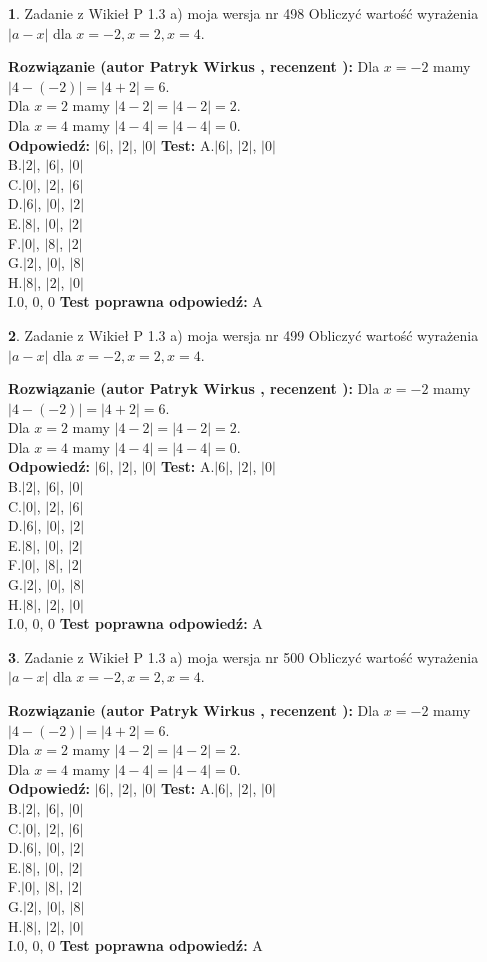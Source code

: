 \documentclass[12pt, a4paper]{article}
\theoremstyle{definition} %
\newtheorem{zad}{}
\newcommand{\zadStart}[1]{\begin{zad}#1\newline}
\newcommand{\zadStop}{\end{zad}}
\newcommand{\rozwStart}[2]{\noindent \textbf{Rozwiązanie (autor #1 , recenzent #2): }\newline}
\newcommand{\rozwStop}{\newline}
\newcommand{\odpStart}{\noindent \textbf{Odpowiedź:}\newline}
\newcommand{\odpStop}{\newline}
\newcommand{\testStart}{\noindent \textbf{Test:}\newline}
\newcommand{\testStop}{\newline}
\newcommand{\kluczStart}{\noindent \textbf{Test poprawna odpowiedź:}\newline}
\newcommand{\kluczStop}{\newline}
\begin{document}
\zadStart{Zadanie z Wikieł P 1.3 a) moja wersja nr 498}
Obliczyć wartość wyrażenia $|a - x|$ dla $x=-2,x=2,x=4$.
\zadStop
\rozwStart{Patryk Wirkus}{}
Dla $x = -2$ mamy $|4 - (-2)| = |4 + 2| = 6$.\\
Dla $x = 2$ mamy $|4 - 2| = |4 - 2| = 2$.\\
Dla $x = 4$ mamy $|4 - 4| = |4 - 4| = 0$.\\
\rozwStop
\odpStart
$|6|$, $|2|$, $|0|$
\odpStop
\testStart
A.$|6|$, $|2|$, $|0|$\\
B.$|2|$, $|6|$, $|0|$\\
C.$|0|$, $|2|$, $|6|$\\
D.$|6|$, $|0|$, $|2|$\\
E.$|8|$, $|0|$, $|2|$\\
F.$|0|$, $|8|$, $|2|$\\
G.$|2|$, $|0|$, $|8|$\\
H.$|8|$, $|2|$, $|0|$\\
I.$0$, $0$, $0$
\testStop
\kluczStart
A
\kluczStop



\zadStart{Zadanie z Wikieł P 1.3 a) moja wersja nr 499}
Obliczyć wartość wyrażenia $|a - x|$ dla $x=-2,x=2,x=4$.
\zadStop
\rozwStart{Patryk Wirkus}{}
Dla $x = -2$ mamy $|4 - (-2)| = |4 + 2| = 6$.\\
Dla $x = 2$ mamy $|4 - 2| = |4 - 2| = 2$.\\
Dla $x = 4$ mamy $|4 - 4| = |4 - 4| = 0$.\\
\rozwStop
\odpStart
$|6|$, $|2|$, $|0|$
\odpStop
\testStart
A.$|6|$, $|2|$, $|0|$\\
B.$|2|$, $|6|$, $|0|$\\
C.$|0|$, $|2|$, $|6|$\\
D.$|6|$, $|0|$, $|2|$\\
E.$|8|$, $|0|$, $|2|$\\
F.$|0|$, $|8|$, $|2|$\\
G.$|2|$, $|0|$, $|8|$\\
H.$|8|$, $|2|$, $|0|$\\
I.$0$, $0$, $0$
\testStop
\kluczStart
A
\kluczStop



\zadStart{Zadanie z Wikieł P 1.3 a) moja wersja nr 500}
Obliczyć wartość wyrażenia $|a - x|$ dla $x=-2,x=2,x=4$.
\zadStop
\rozwStart{Patryk Wirkus}{}
Dla $x = -2$ mamy $|4 - (-2)| = |4 + 2| = 6$.\\
Dla $x = 2$ mamy $|4 - 2| = |4 - 2| = 2$.\\
Dla $x = 4$ mamy $|4 - 4| = |4 - 4| = 0$.\\
\rozwStop
\odpStart
$|6|$, $|2|$, $|0|$
\odpStop
\testStart
A.$|6|$, $|2|$, $|0|$\\
B.$|2|$, $|6|$, $|0|$\\
C.$|0|$, $|2|$, $|6|$\\
D.$|6|$, $|0|$, $|2|$\\
E.$|8|$, $|0|$, $|2|$\\
F.$|0|$, $|8|$, $|2|$\\
G.$|2|$, $|0|$, $|8|$\\
H.$|8|$, $|2|$, $|0|$\\
I.$0$, $0$, $0$
\testStop
\kluczStart
A
\kluczStop
\end{document}

